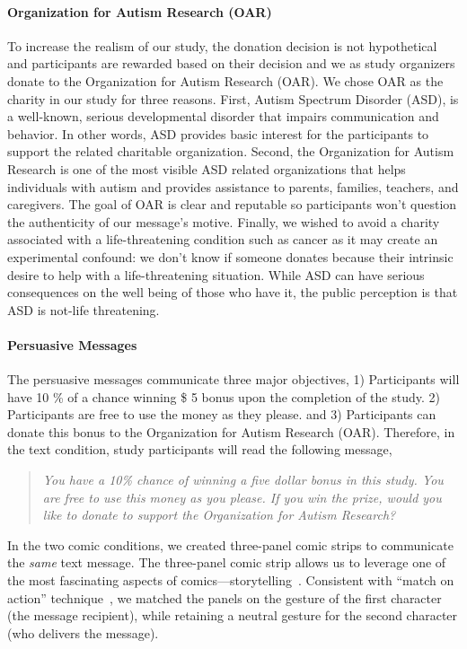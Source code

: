 \paragraph{Organization for Autism Research (OAR)}
To increase the realism of our study, the donation decision is not hypothetical and participants are rewarded based on their decision and we as study organizers donate to the Organization for Autism Research (OAR). We chose OAR as the charity in our study for three reasons. First, Autism Spectrum Disorder (ASD), is a well-known, serious developmental disorder that impairs communication and behavior. In other words, ASD provides basic interest for the participants to support the related charitable organization. Second, the Organization for Autism Research is one of the most visible ASD related organizations that helps individuals with autism and provides assistance to parents, families, teachers, and caregivers. The goal of OAR is clear and reputable so participants won't question the authenticity of our message's motive. Finally, we wished to avoid a charity associated with a life-threatening condition such as cancer as it may create an experimental confound: we don't know if someone donates because their intrinsic desire to help with a life-threatening situation. While ASD can have serious consequences on the well being of those who have it, the public perception is that ASD is not-life threatening. 

\paragraph{Persuasive Messages}
The persuasive messages communicate three major objectives, 1) Participants will have 10 \% of a chance winning \$ 5 bonus upon the completion of the study. 2) Participants are free to use the money as they please. and 3) Participants can donate this bonus to the Organization for Autism Research (OAR). Therefore, in the text condition, study participants will read the following message,
\begin{quote}
  \textit{You have a 10\% chance of winning a five dollar bonus in this study. You are free to use this money as you please. If you win the prize, would you like to donate to support the Organization for Autism Research?}
\end{quote}
In the two comic conditions, we created three-panel comic strips to communicate the \textit{same} text message. The three-panel comic strip allows us to leverage one of the most fascinating aspects of comics---storytelling~\cite{scott1993understanding}. 
Consistent with ``match on action'' technique~\cite{scott1993understanding}, we matched the panels on the gesture of the first character (the message recipient), while retaining a neutral gesture for the second character (who delivers the message). 

